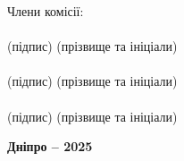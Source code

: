 \documentclass[main.tex]{subfiles}
\begin{document}
\begin{center}
\begin{minipage}[t]{0.45\textwidth}
\begin{flushright}
            Члени комісії:\\
            \underline{\hspace{3cm}} \underline{\hspace{2cm}}\\
            \hspace*{1cm}\footnotesize{(підпис)} \hspace*{2cm} \footnotesize{(прізвище та ініціали)}\\[0.3cm]
            \underline{\hspace{3cm}} \underline{\hspace{2cm}}\\
            \hspace*{1cm}\footnotesize{(підпис)} \hspace*{2cm} \footnotesize{(прізвище та ініціали)}\\[0.3cm]
            \underline{\hspace{3cm}} \underline{\hspace{2cm}}\\
            \hspace*{1cm}\footnotesize{(підпис)} \hspace*{2cm} \footnotesize{(прізвище та ініціали)}\\[0.3cm]
        \end{flushright}
    \end{minipage}
    
    \vfill
    
    \textbf{Дніпро – 2025}
\end{center}
\end{document}
